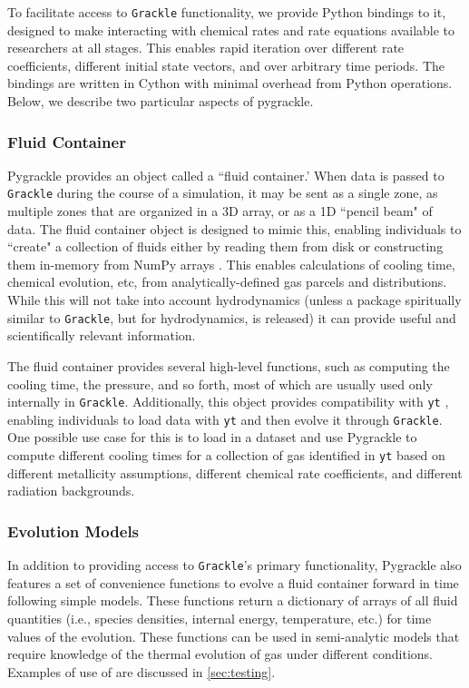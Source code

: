 To facilitate access to \texttt{Grackle} functionality, we provide Python bindings to
it, designed to make interacting with chemical rates and rate equations
available to researchers at all stages.  This enables rapid iteration over
different rate coefficients, different initial state vectors, and over
arbitrary time periods.  The bindings are written in Cython
\citep{behnel2010cython} with minimal overhead from Python operations.  Below,
we describe two particular aspects of pygrackle.

\subsubsection{Fluid Container} \label{sec:pyfluid}

Pygrackle provides an object called a ``fluid container.'  When data is passed
to \texttt{Grackle} during the course of a simulation, it may be sent as a single zone,
as multiple zones that are organized in a 3D array, or as a 1D ``pencil beam" of
data.  The fluid container object is designed to mimic this, enabling
individuals to ``create" a collection of fluids either by reading them from
disk or constructing them in-memory from NumPy arrays \citep{numpy}.  This
enables calculations of cooling time, chemical evolution, etc, from
analytically-defined gas parcels and distributions.  While this will not take
into account hydrodynamics (unless a package spiritually similar to \texttt{Grackle},
but for hydrodynamics, is released) it can provide useful and scientifically
relevant information.

The fluid container provides several high-level functions, such as computing
the cooling time, the pressure, and so forth, most of which are usually used
only internally in \texttt{Grackle}.  Additionally, this object provides compatibility
with \texttt{yt} \citep{2011ApJS..192....9T}, enabling individuals to load data
with \texttt{yt} and then evolve it through \texttt{Grackle}.  One possible use case for
this is to load in a dataset and use Pygrackle to compute different cooling
times for a collection of gas identified in \texttt{yt} based on different
metallicity assumptions, different chemical rate coefficients, and different
radiation backgrounds.

\subsubsection{Evolution Models} \label{sec:pyevolve}

In addition to providing access to \texttt{Grackle}'s primary
functionality, Pygrackle also features a set of convenience functions
to evolve a fluid container forward in time following simple models.
These functions return a dictionary of arrays of all fluid quantities
(i.e., species densities, internal energy, temperature, etc.) for time
values of the evolution.  These functions can be used in semi-analytic
models that require knowledge of the thermal evolution of gas under
different conditions.  Examples of use of are discussed in
\ref{sec:testing}.

